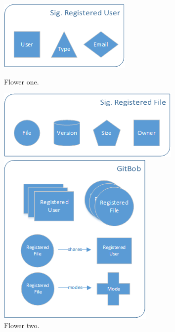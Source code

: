 \documentclass[paper=a4, fontsize=11pt]{scrartcl} %
\numberwithin{equation}{section} %
\numberwithin{figure}{section} %
\numberwithin{table}{section} %
\begin{document}
\begin{figure}[h]
  \centering
  \begin{minipage}[b]{0.25\textwidth}
    \includegraphics[width=\textwidth]{sig_reg_user.png}
    \caption{Flower one.}
  \end{minipage}
  \hfill
  \begin{minipage}[b]{0.3\textwidth}
    \includegraphics[width=\textwidth]{sig_reg_file.png}
    \caption{Flower two.}
  \end{minipage}
  \hfill
   \begin{minipage}[b]{0.35\textwidth}
    \includegraphics[width=\textwidth]{sig_gitbob.png}

\end{minipage}
\end{figure}
\end{document}
